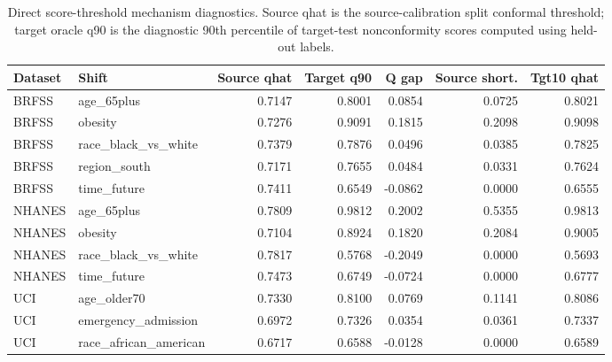 \begin{table}[!tbp]
\centering
\caption{Direct score-threshold mechanism diagnostics. Source qhat is the source-calibration split conformal threshold; target oracle q90 is the diagnostic 90th percentile of target-test nonconformity scores computed using held-out labels.}
\label{primary-tab:score_mechanism}
\scriptsize
\setlength{\tabcolsep}{3pt}
\begin{adjustbox}{max width=\textwidth}
\begin{tabular}{llrrrrr}
\toprule
Dataset & Shift & Source qhat & Target q90 & Q gap & Source short. & Tgt10 qhat \\
\midrule
BRFSS & age\_65plus & 0.7147 & 0.8001 & 0.0854 & 0.0725 & 0.8021 \\
BRFSS & obesity & 0.7276 & 0.9091 & 0.1815 & 0.2098 & 0.9098 \\
BRFSS & race\_black\_vs\_white & 0.7379 & 0.7876 & 0.0496 & 0.0385 & 0.7825 \\
BRFSS & region\_south & 0.7171 & 0.7655 & 0.0484 & 0.0331 & 0.7624 \\
BRFSS & time\_future & 0.7411 & 0.6549 & -0.0862 & 0.0000 & 0.6555 \\
NHANES & age\_65plus & 0.7809 & 0.9812 & 0.2002 & 0.5355 & 0.9813 \\
NHANES & obesity & 0.7104 & 0.8924 & 0.1820 & 0.2084 & 0.9005 \\
NHANES & race\_black\_vs\_white & 0.7817 & 0.5768 & -0.2049 & 0.0000 & 0.5693 \\
NHANES & time\_future & 0.7473 & 0.6749 & -0.0724 & 0.0000 & 0.6777 \\
UCI & age\_older70 & 0.7330 & 0.8100 & 0.0769 & 0.1141 & 0.8086 \\
UCI & emergency\_admission & 0.6972 & 0.7326 & 0.0354 & 0.0361 & 0.7337 \\
UCI & race\_african\_american & 0.6717 & 0.6588 & -0.0128 & 0.0000 & 0.6589 \\
\bottomrule
\end{tabular}
\end{adjustbox}
\end{table}
